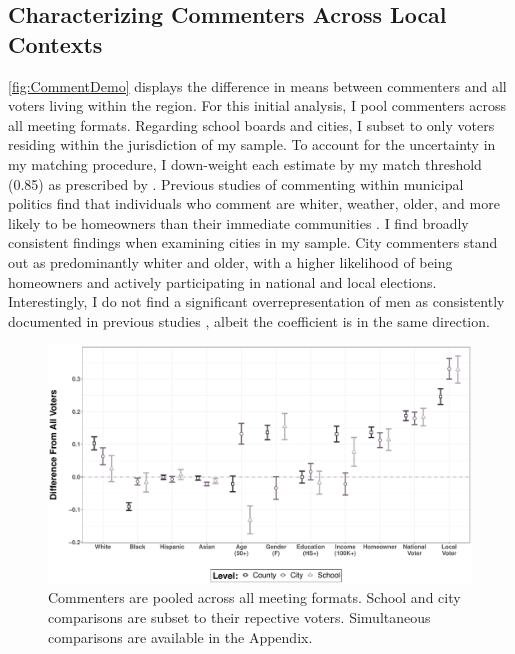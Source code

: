 \subsection{Characterizing Commenters Across Local Contexts}
\autoref{fig:CommentDemo} displays the difference in means between commenters and all voters living within the region. For this initial analysis, I pool commenters across all meeting formats. Regarding school boards and cities, I subset to only voters residing within the jurisdiction of my sample. To account for the uncertainty in my matching procedure, I down-weight each estimate by my match threshold (0.85) as prescribed by \citet{enamoradoUsingProbabilisticModel2019}. Previous studies of commenting within municipal politics find that individuals who comment are whiter, weather, older, and more likely to be homeowners than their immediate communities \citep{einsteinWhoParticipatesLocal2019,yoderDoesPropertyOwnership2020}. I find broadly consistent findings when examining cities in my sample. City commenters stand out as predominantly whiter and older, with a higher likelihood of being homeowners and actively participating in national and local elections. Interestingly, I do not find a significant overrepresentation of men as consistently documented in previous studies \citep[e.g,][]{einsteinStillMutedLimited2022}, albeit the coefficient is in the same direction.

\begin{figure}[H]
    \centering
     \par\medskip
    \includegraphics[scale=0.41]{Figures/CommentDemoPooled.pdf}
    \caption[Difference Between Voters and Commenters]{\footnotesize{Commenters are pooled across all meeting formats. School and city comparisons are subset to their repective voters. Simultaneous comparisons are available in the Appendix.}}
    \label{fig:CommentDemo}
\end{figure}

